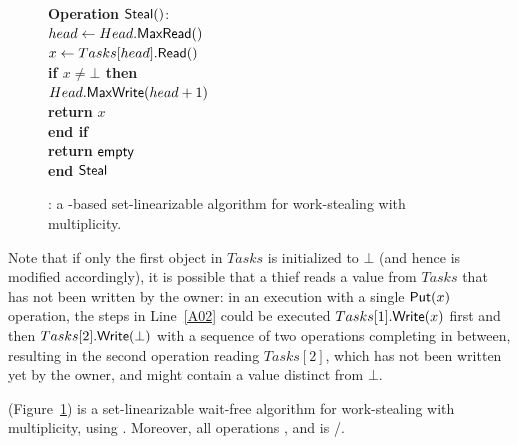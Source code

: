 \begin{figure}[ht]
{\begin{minipage}[t]{150mm}
\begin{tabbing}
        {\bf Operation} \({\sf \small Steal}()\): \\
         \> \> \(head \leftarrow Head.{\sf \small MaxRead}()\)\\
         \> \> \(x \leftarrow Tasks[head].{\sf \small Read}()\) \\
         \> \> {\bf if \(x \neq \bot\) then}\\
         \> \> \> \(Head.{\sf \small MaxWrite}(head+1)\)\\

         \> \> \> {\bf return} \(x\)\\
         \> \> {\bf end if}\\
         \> \> {\bf return} ${\sf \small empty}$\\
        {\bf end} ${\sf \small Steal}$

      \end{tabbing}
    \end{minipage}
  }
  \caption{\label{figure-max-reg-mult}\WFWSM: a \MaxReg-based
    set-linearizable algorithm for work-stealing with multiplicity.}
\end{figure}

Note that if only the first object in \(Tasks\) is initialized to \(\bot\) (and hence \Put is modified accordingly), it is possible that a thief reads a value from \(Tasks\) that has not been written by the owner: in an execution with a single \({\sf \small Put}(x)\) operation, the steps in Line~\ref{A02} could be executed \(Tasks[1].{\sf \small Write}(x)\) first and then \(Tasks[2].{\sf \small Write}(\bot)\) with a sequence of two \Steal operations completing in between, resulting in the second operation reading $Tasks[2]$, which has not been written yet by the owner, and might contain a value distinct from \(\bot\).


\begin{theorem}\label{theo-wf}
\WFWSM (Figure~\ref{figure-max-reg-mult}) is a set-linearizable wait-free algorithm for work-stealing with multiplicity, using .  Moreover, all operations , and \Put is \R/\W.
\end{theorem}


